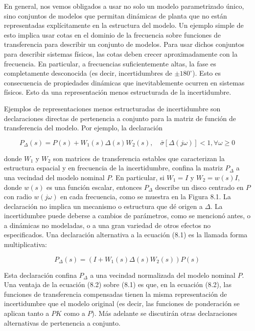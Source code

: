 En general, nos vemos obligados a usar no solo un modelo parametrizado único, sino conjuntos de modelos que permitan dinámicas de planta que no están representadas explícitamente en la estructura del modelo. Un ejemplo simple de esto implica usar cotas en el dominio de la frecuencia sobre funciones de transferencia para describir un conjunto de modelos. Para usar dichos conjuntos para describir sistemas físicos, las cotas deben crecer aproximadamente con la frecuencia. En particular, a frecuencias suficientemente altas, la fase es completamente desconocida (es decir, incertidumbres de $\pm 180^{\circ}$). Esto es consecuencia de propiedades dinámicas que inevitablemente ocurren en sistemas físicos. Esto da una representación menos estructurada de la incertidumbre.

Ejemplos de representaciones menos estructuradas de incertidumbre son declaraciones directas de pertenencia a conjunto para la matriz de función de transferencia del modelo. Por ejemplo, la declaración


\begin{equation*}
P_{\Delta}(s)=P(s)+W_{1}(s) \Delta(s) W_{2}(s), \quad \bar{\sigma}[\Delta(j \omega)]<1, \forall \omega \geq 0 \tag{8.1}
\end{equation*}


donde $W_{1}$ y $W_{2}$ son matrices de transferencia estables que caracterizan la estructura espacial y en frecuencia de la incertidumbre, confina la matriz $P_{\Delta}$ a una vecindad del modelo nominal $P$. En particular, si $W_{1}=I$ y $W_{2}=w(s) I$, donde $w(s)$ es una función escalar, entonces $P_{\Delta}$ describe un disco centrado en $P$ con radio $w(j \omega)$ en cada frecuencia, como se muestra en la Figura 8.1. La declaración no implica un mecanismo o estructura que dé origen a $\Delta$. La incertidumbre puede deberse a cambios de parámetros, como se mencionó antes, o a dinámicas no modeladas, o a una gran variedad de otros efectos no especificados. Una declaración alternativa a la ecuación (8.1) es la llamada forma multiplicativa:


\begin{equation*}
P_{\Delta}(s)=\left(I+W_{1}(s) \Delta(s) W_{2}(s)\right) P(s) \tag{8.2}
\end{equation*}


Esta declaración confina $P_{\Delta}$ a una vecindad normalizada del modelo nominal $P$. Una ventaja de la ecuación (8.2) sobre (8.1) es que, en la ecuación (8.2), las funciones de transferencia compensadas tienen la misma representación de incertidumbre que el modelo original (es decir, las funciones de ponderación se aplican tanto a $P K$ como a $P$). Más adelante se discutirán otras declaraciones alternativas de pertenencia a conjunto.

